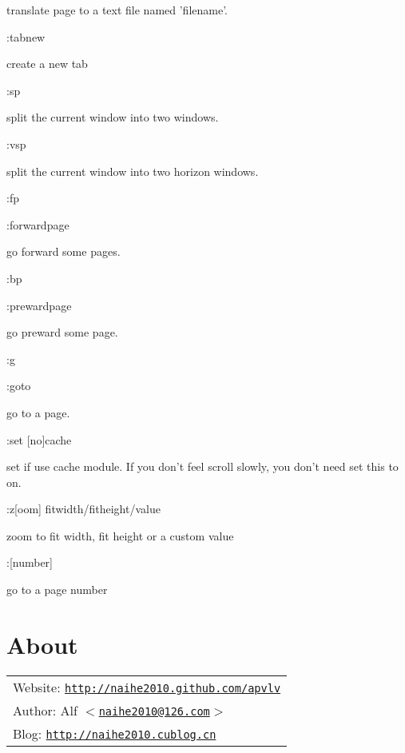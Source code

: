 \documentclass[a4paper,12pt]{article}
\begin{document}
\begin{description}
translate page to a text file named 'filename'.

\item :tabnew

create a new tab

\item :sp

split the current window into two windows.

\item :vsp

split the current window into two horizon windows.

\item :fp

\item :forwardpage 

go forward some pages.

\item :bp

\item :prewardpage

go preward some page.

\item :g

\item :goto

go to a page.

\item :set [no]cache

set if use cache module. If you don't feel scroll slowly, you don't need set this to on.

\item :z[oom] fitwidth/fitheight/value

zoom to fit width, fit height or a custom value

\item :[number]

go to a page number

\end{description}

\newpage

\section{About}\label{about}

\large
\begin{tabular}{l}
  Website: \texttt{\href{http://naihe2010.github.com/apvlv}{http://naihe2010.github.com/apvlv}} \\
  Author: Alf \texttt{\href{mailto:naihe2010@126.com}{$<$naihe2010@126.com$>$}} \\
Blog: \texttt{\href{http://naihe2010.cublog.cn}{http://naihe2010.cublog.cn}}
\end{tabular}
\end{document}
